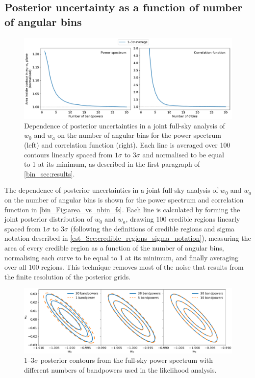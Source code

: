 \subsection{Posterior uncertainty as a function of number of angular bins}
\label{bin_sec:results}

\begin{figure}[t]
\includegraphics[width=\textwidth]{area_vs_nbin_fs}
\caption{Dependence of posterior uncertainties in a joint full-sky analysis of $w_0$ and $w_a$ on the number of angular bins for the power spectrum (left) and correlation function (right). Each line is averaged over 100 contours linearly spaced from $1\sigma$ to $3\sigma$ and normalised to be equal to 1 at its minimum, as described in the first paragraph of \autoref{bin_sec:results}.}
\label{bin_Fig:area_vs_nbin_fs}
\end{figure}

The dependence of posterior uncertainties in a joint full-sky analysis of $w_0$ and $w_a$ on the number of angular bins is shown for the power spectrum and correlation function in \autoref{bin_Fig:area_vs_nbin_fs}.
Each line is calculated by forming the joint posterior distribution of $w_0$ and $w_a$, drawing 100 credible regions linearly spaced from $1\sigma$ to $3\sigma$ (following the definitions of credible regions and sigma notation described in \autoref{est_Sec:credible_regions_sigma_notation}), measuring the area of every credible region as a function of the number of angular bins, normalising each curve to be equal to 1 at its minimum, and finally averaging over all 100 regions. This technique removes most of the noise that results from the finite resolution of the posterior grids.

\begin{figure}[t]
\includegraphics[width=\textwidth]{posts_w0wa_cl}
\caption{1--3$\sigma$ posterior contours from the full-sky power spectrum with different numbers of bandpowers used in the likelihood analysis.}
\label{bin_Fig:posts_w0wa_cl}
\end{figure}

